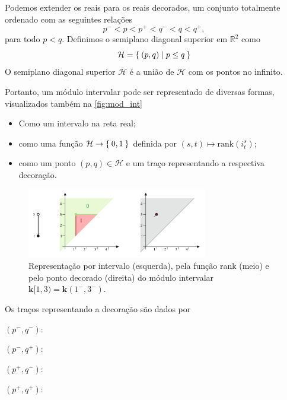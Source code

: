 Podemos extender os reais para os reais decorados, um conjunto totalmente ordenado com as seguintes relações
\begin{equation*}
    p^- < p < p^+ < q^- < q < q^+,
\end{equation*}
para todo $p < q$. Definimos o semiplano diagonal superior em $\mathbb{R}^2$ como 
\begin{equation*}
    \mathcal{H} = \Set{(p,q) | p \leq q}
\end{equation*}
O semiplano diagonal superior $\bar{\mathcal{H}}$ é a união de $\mathcal{H}$ com os pontos no infinito. 

Portanto, um módulo intervalar pode ser representado de diversas formas, visualizados também na \autoref{fig:mod_int}
\begin{itemize}
    \item Como um intervalo na reta real;
    \item como uma função $\mathcal{H} \to \Set{0,1}$ definida por $(s,t) \mapsto \text{rank}(i^s_t)$; 
    \item como um ponto $(p,q) \in \mathcal{H}$ e um traço representando a respectiva decoração.
\end{itemize}
 
\begin{figure}[htpb!] 
    \centering
    \includegraphics[width=0.7\textwidth]{images/ex_interval_module.png}
    \caption{Representação por intervalo (esquerda), pela função rank (meio) e pelo ponto decorado (direita) do 
            módulo intervalar $\mathbf{k}[1,3) = \mathbf{k}(1^-, 3^-)$.}  
    \label{fig:mod_int}
\end{figure}
Os traços representando a decoração são dados por
\begin{center}
    $(p^-,q^-): $ 

    $(p^-,q^+): $ 

    $(p^+,q^-): $ 

    $(p^+,q^+): $ 
\end{center}

